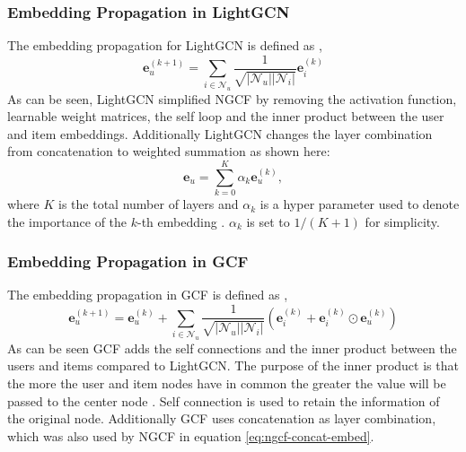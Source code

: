 \subsubsection{Embedding Propagation in LightGCN}\label{subsubsec:LightGCN-embed-propagation}
The embedding propagation for LightGCN is defined as \cite{lightgcn},
\begin{equation}
    \mathbf{e}_{u}^{(k+1)} = \sum^{}_{i \in \mathcal{N}_u} \frac{1}{\sqrt{|\mathcal{N}_u||\mathcal{N}_i|}} \mathbf{e}_i^{(k)}
    \label{eq:lightgcn-propagation}
\end{equation}
As can be seen, LightGCN simplified NGCF by removing the activation function, learnable weight matrices, the self loop and the inner product between the user and item embeddings.
Additionally LightGCN changes the layer combination from concatenation to weighted summation as shown here:
\begin{equation}
    \mathbf{e}_u = \sum_{k=0}^{K} \alpha_k \mathbf{e}_u^{(k)},
    \label{eq:lightgcn-sum}
\end{equation}
where $K$ is the total number of layers and $\alpha_k$ is a hyper parameter used to denote the importance of the $k$-th embedding \cite{lightgcn}.
$\alpha_k$ is set to $1 /(K + 1)$ for simplicity.

\subsubsection{Embedding Propagation in GCF}\label{subsubsec:GCF-embed-propagation}
The embedding propagation in GCF is defined as \cite{BiTGCF},
\begin{equation}
    \mathbf{e}_{u}^{(k+1)} = \mathbf{e}_{u}^{(k)} + \sum^{}_{i \in \mathcal{N}_u}  \frac{1}{\sqrt{|\mathcal{N}_u||\mathcal{N}_i|}}\left( \mathbf{e}_i^{(k)} + \mathbf{e}_i^{(k)} \odot \mathbf{e}_u^{(k)} \right)
    \label{eq:GCF-embedding}
\end{equation}
As can be seen GCF adds the self connections and the inner product between the users and items compared to LightGCN.
The purpose of the inner product is that the more the user and item nodes have in common the greater the value will be passed to the center node \cite{BiTGCF}.
Self connection is used to retain the information of the original node.
Additionally GCF uses concatenation as layer combination, which was also used by NGCF in equation \autoref{eq:ngcf-concat-embed}.
